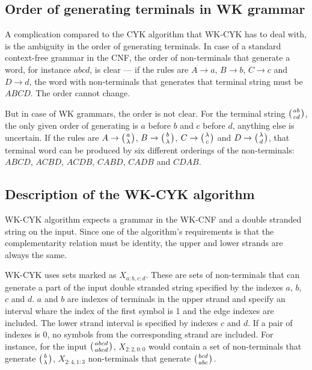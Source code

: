 \subsection{Order of generating terminals in WK grammar}

A complication compared to the CYK algorithm that WK-CYK has to deal with, is the ambiguity in the order of generating terminals. In case of a standard context-free grammar in the CNF, the order of non-terminals that generate a word, for instance $abcd$, is clear --- if the rules are $A \rightarrow a$, $B \rightarrow b$, $C \rightarrow c$ and $D \rightarrow d$, the word with non-terminals that generates that terminal string must be $ABCD$. The order cannot change.

But in case of WK grammars, the order is not clear. For the terminal string $\wkpair{ab}{cd}$, the only given order of generating is $a$ before $b$ and $c$ before $d$, anything else is uncertain. If the rules are $A \rightarrow \wkpair{a}{\lambda}$, $B \rightarrow \wkpair{b}{\lambda}$, $C \rightarrow \wkpair{\lambda}{c}$ and $D \rightarrow \wkpair{\lambda}{d}$, that terminal word can be produced by six different orderings of the non-terminals:
$ABCD$, $ACBD$, $ACDB$, $CABD$, $CADB$ and $CDAB$.

\subsection{Description of the WK-CYK algorithm}
WK-CYK algorithm expects a grammar in the WK-CNF and a double stranded string on the input. Since one of the algorithm's requirements is that the complementarity relation must be identity, the upper and lower strands are always the same.

WK-CYK uses sets marked as $X_{a:b,c:d}$. These are sets of non-terminals that can generate a part of the input double stranded string specified by the indexes $a$, $b$, $c$ and $d$. $a$ and $b$ are indexes of terminals in the upper strand and specify an interval whare the index of the first symbol is 1 and the edge indexes are included. The lower strand interval is specified by indexes $c$ and $d$. If a pair of indexes is 0, no symbols from the corresponding strand are included. For instance, for the input $\wkpair{abcd}{abcd}$, $X_{2:2,0:0}$ would contain a set of non-terminals that generate $\wkpair{b}{\lambda}$, $X_{2:4,1:3}$ non-terminals that generate $\wkpair{bcd}{abc}$.


